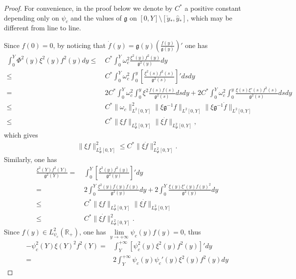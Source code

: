 \documentclass{amsart}
\numberwithin{equation}{section}
\begin{document}
\begin{proof}
For convenience, in the proof below we denote by $C^{*}$ a positive constant depending only on $\psi_{c}$ and the values of $\mathfrak{g}$ on $[0,Y]\setminus[\check{y}_{*},\hat{y}_{*}]$, which may be different from line to line.

Since $f(0)=0$, by noticing that $\dot{f}(y)=\mathfrak{g}(y)\left(\frac{f(y)}{\mathfrak{g}(y)}\right)'$ one has
\begin{align*}
\int_{0}^{Y}\Phi^{2}(y)\xi^{2}(y)f^{2}(y)dy
\leq&~C^{*}\int_{0}^{Y}\omega_{c}^{2}\frac{\xi^{2}(y)f^{2}(y)}{\mathfrak{g}^{2}(y)}dy\\
\leq&~C^{*}\int_{0}^{Y}\omega_{c}^{2}\int_{0}^{y}\left[\frac{\xi^{2}(s)f^{2}(s)}{\mathfrak{g}^{2}(s)}\right]'dsdy\nonumber\\
=&~2C^{*}\int_{0}^{Y}\omega_{c}^{2}\int_{0}^{y}\xi^{2}\frac{\dot{f}(s)f(s)}{\mathfrak{g}^{2}(s)}dsdy
  +2C^{*}\int_{0}^{Y}\omega_{c}^{2}\int_{0}^{y}\frac{\xi(s)\xi'(s)f^{2}(s)}{\mathfrak{g}^{2}(s)}dsdy\nonumber\\
\leq&~C^{*}\|\omega_{c}\|_{L^{2}[0,Y]}^{2}\|\xi\mathfrak{g}^{-1}f\|_{L^{2}[0,Y]}\|\xi\mathfrak{g}^{-1}\dot{f}\|_{L^{2}[0,Y]}\nonumber\\
\leq&~C^{*}\|\xi f\|_{L_{\Phi}^{2}[0,Y]}\|\xi\dot{f}\|_{L_{\Phi}^{2}[0,Y]},\nonumber
\end{align*}
which gives
\begin{align}\label{nc1}
\|\xi f\|_{L_{\Phi}^{2}[0,Y]}^{2}
\leq C^{*}\|\xi\dot{f}\|_{L_{\Phi}^{2}[0,Y]}^{2}.
\end{align}
Similarly, one has
\begin{align}\label{nc2}
\frac{\xi^{2}(Y)f^{2}(Y)}{\mathfrak{g}^{2}(Y)}
=&~\int_{0}^{Y}\left[\frac{\xi^{2}(y)f^{2}(y)}{\mathfrak{g}^{2}(y)}\right]'dy\\
=&~2\int_{0}^{Y}\frac{\xi^{2}(y)f(y)\dot{f}(y)}{\mathfrak{g}^{2}(y)}dy
  +2\int_{0}^{Y}\frac{\xi(y)\xi'(y)f(y)^{2}}{\mathfrak{g}^{2}(y)}dy\nonumber\\
\leq&~C^{*}\|\xi f\|_{L_{\Phi}^{2}[0,Y]}\|\xi\dot{f}\|_{L_{\Phi}^{2}[0,Y]}\nonumber\\
\leq&~C^{*}\|\xi\dot{f}\|_{L_{\Phi}^{2}[0,Y]}^{2}.\nonumber
\end{align}
Since $f(y)\in L_{\psi_{c}}^{2}(\mathbb{R}_{+})$, one has $\lim\limits_{y\to+\infty}\psi_{c}(y)f(y)=0$, thus
\begin{align*}
-\psi_{c}^{2}(Y)\xi(Y)^{2}f^{2}(Y)
=&\int_{Y}^{+\infty}\left[\psi_{c}^{2}(y)\xi^{2}(y)f^{2}(y)\right]'dy\\
=& 2\int_{Y}^{+\infty}\psi_{c}(y)\psi_{c}'(y)\xi^{2}(y)f^{2}(y)dy

\end{align*}
\end{proof}
\end{document}
